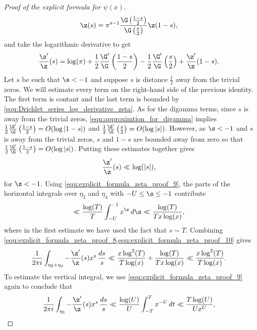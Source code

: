 \begin{proof}[Proof of the explicit formula for $\psi(x)$]
        \[
          \z(s) = \pi^{s-1}\frac{\G\left(\frac{1-s}{2}\right)}{\G\left(\frac{s}{2}\right)}\z(1-s),
        \]
        and take the logarithmic derivative to get
        \[
          \frac{\z'}{\z}(s) = \log(\pi)+\frac{1}{2}\frac{\G'}{\G}\left(\frac{1-s}{2}\right)-\frac{1}{2}\frac{\G'}{\G}\left(\frac{s}{2}\right)+\frac{\z'}{\z}(1-s).
        \]
        Let $s$ be such that $\s < -1$ and suppose $s$ is distance $\frac{1}{2}$ away from the trivial zeros. We will estimate every term on the right-hand side of the previous identity. The first term is contant and the last term is bounded by \cref{equ:Drichlet_series_log_derivative_zeta}. As for the digamma terms, since $s$ is away from the trivial zeros, \cref{equ:approximtion_for_digamma} implies $\frac{1}{2}\frac{\G'}{\G}\left(\frac{1-s}{2}\right) = O(\log|1-s|)$ and $\frac{1}{2}\frac{\G'}{\G}\left(\frac{s}{2}\right) = O(\log|s|)$. However, as $\s < -1$ and $s$ is away from the trivial zeros, $s$ and $1-s$ are bounded away from zero so that $\frac{1}{2}\frac{\G'}{\G}\left(\frac{1-s}{2}\right) = O(\log|s|)$. Putting these estimates together gives
        \begin{equation}\label{equ:explicit_formula_zeta_proof_9}
          \frac{\z'}{\z}(s) \ll \log(|s|),
        \end{equation}
        for $\s < -1$. Using \cref{equ:explicit_formula_zeta_proof_9}, the parts of the horizontal integrals over $\eta_{2}$ and $\eta_{4}$ with $-U \le \s \le -1$ contribute
        \begin{equation}\label{equ:explicit_formula_zeta_proof_10}
          \ll \frac{\log(T)}{T}\int_{-U}^{-1}x^{\s}\,d\s \ll \frac{\log(T)}{Tx\log(x)},
        \end{equation}
        where in the first estimate we have used the fact that $s \sim T$. Combining \cref{equ:explicit_formula_zeta_proof_8,equ:explicit_formula_zeta_proof_10} gives
        \begin{equation}\label{equ:explicit_formula_zeta_proof_11}
          \frac{1}{2\pi i}\int_{\eta_{2}+\eta_{4}}-\frac{\z'}{\z}(s)x^{s}\,\frac{ds}{s} \ll \frac{x\log^{2}(T)}{T\log(x)}+\frac{\log(T)}{Tx\log(x)} \ll \frac{x\log^{2}(T)}{T\log(x)}.
        \end{equation}
        To estimate the vertical integral, we use \cref{equ:explicit_formula_zeta_proof_9} again to conclude that
        \begin{equation}\label{equ:explicit_formula_zeta_proof_12}
          \frac{1}{2\pi i}\int_{\eta_{3}}-\frac{\z'}{\z}(s)x^{s}\,\frac{ds}{s} \ll \frac{\log(U)}{U}\int_{-T}^{T}x^{-U}\,dt \ll \frac{T\log(U)}{Ux^{U}},

\end{equation}
\end{proof}
